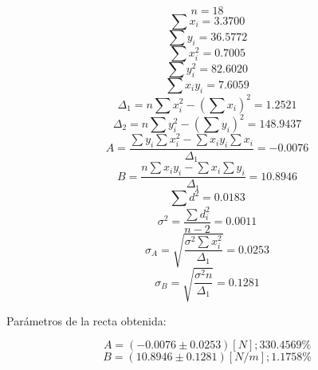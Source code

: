 \documentclass[letter,11pt]{article}
\begin{document}
\begin{equation*}
    n = 18
\end{equation*}
\begin{equation*}
    \sum x_i = 3.3700
\end{equation*}
\begin{equation*}
    \sum y_i = 36.5772
\end{equation*}
\begin{equation*}
    \sum x^2_i = 0.7005
\end{equation*}
\begin{equation*}
    \sum y^2_i = 82.6020
\end{equation*}
\begin{equation*}
    \sum x_i y_i = 7.6059
\end{equation*}
\begin{equation*}
    \Delta_1 = n \sum x^2_i - \left( \sum x_i \right)^2 = 1.2521
\end{equation*}
\begin{equation*}
    \Delta_2 = n \sum y^2_i - \left( \sum y_i \right)^2 = 148.9437
\end{equation*}
\begin{equation*}
    A = \frac{\sum y_i \sum x^2_i - \sum x_i y_i \sum x_i}{\Delta_1} = -0.0076
\end{equation*}
\begin{equation*}
    B = \frac{n \sum x_i y_i - \sum x_i \sum y_i}{\Delta_1} = 10.8946
\end{equation*}
\begin{equation*}
    \sum d^2 = 0.0183
\end{equation*}
\begin{equation*}
    \sigma^2 = \frac{\sum d^2_i}{n-2} = 0.0011
\end{equation*}
\begin{equation*}
    \sigma_A = \sqrt{\frac{\sigma^2 \sum x^2_i}{\Delta_1}} = 0.0253
\end{equation*}
\begin{equation*}
    \sigma_B = \sqrt{\frac{\sigma^2 n}{\Delta_1}} = 0.1281
\end{equation*}
\vspace{0.10cm}

Parámetros de la recta obtenida:

\begin{equation*}
    A = (-0.0076 \pm 0.0253) [N]; 330.4569\%
\end{equation*}
\begin{equation*}
    B = (10.8946 \pm 0.1281) [N/m]; 1.1758\%
\end{equation*}
\vspace{0.10cm}
\end{document}
